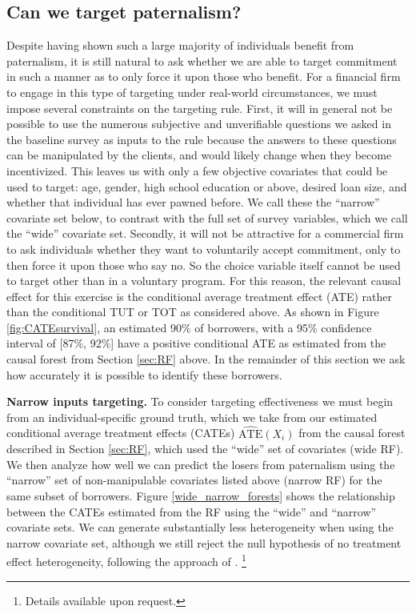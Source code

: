 \documentclass[11pt, a4paper]{article}
\begin{document}
\subsection{Can we target paternalism?}

Despite having shown such a large majority of individuals benefit from paternalism, it is still natural to ask whether we are able to target commitment in such a manner as to only force it upon those who benefit. For a financial firm to engage in this type of targeting under real-world circumstances, we must impose several constraints on the targeting rule.  First, it will in general not be possible to use the numerous subjective and unverifiable questions we asked in the baseline survey as inputs to the rule because the answers to these questions can be manipulated by the clients, and would likely change when they become incentivized. This leaves us with only a few objective covariates that could be used to target: age, gender, high school education or above, desired loan size, and whether that individual has ever pawned before. 
We call these the ``narrow'' covariate set below, to contrast with the full set of survey variables, which we call the ``wide'' covariate set.
Secondly, it will not be attractive for a commercial firm to ask individuals whether they want to voluntarily accept commitment, only to then force it upon those who say no. So the choice variable itself cannot be used to target other than in a voluntary program. 
For this reason, the relevant causal effect for this exercise is the conditional average treatment effect (ATE) rather than the conditional TUT or TOT as considered above.
As shown in Figure \ref{fig:CATEsurvival}, an estimated 90\% of borrowers, with a 95\% confidence interval of [87\%, 92\%] have a positive conditional ATE as estimated from the causal forest from Section \ref{sec:RF} above.
In the remainder of this section we ask how accurately it is possible to identify these borrowers. 

\vspace{.2in}
\noindent \textbf{Narrow inputs targeting.} To consider targeting effectiveness we must begin from an individual-specific ground truth, which we take from our estimated conditional average treatment effects (CATEs) $\widehat{\text{ATE}}(X_i)$ from the causal forest described in Section \ref{sec:RF},  which used the ``wide'' set of covariates (wide RF).%
We then analyze how well we can predict the losers from paternalism using the ``narrow'' set of non-manipulable covariates listed above (narrow RF) for the same subset of borrowers.
Figure \ref{wide_narrow_forests} shows the relationship between the CATEs estimated from the RF using the ``wide'' and ``narrow'' covariate sets.  We can generate substantially less heterogeneity when using the narrow covariate set, although we still reject the null hypothesis of no treatment effect heterogeneity, following the approach of \cite{chernozhukov2018generic}. \footnote{Details available upon request.}%
\end{document}
